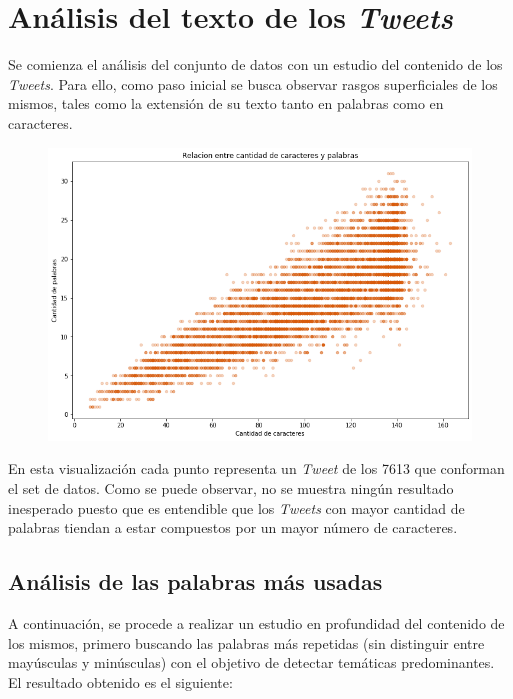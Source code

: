 \documentclass[titlepage,a4paper]{article}
\begin{document}
    \newpage
    \section{Análisis del texto de los \textit{Tweets}}\label{sec:intro}
    
    Se comienza el análisis del conjunto de datos con un estudio del contenido de los \textit{Tweets}. Para ello, como paso inicial se busca observar rasgos superficiales de los mismos, tales como la extensión de su texto tanto en palabras como en caracteres.
    
    \begin{figure}[H]
    \centering
    \includegraphics[width=1\textwidth]{graficos/Analisis Lexico Grafico/relacion_entre_cantidad_caracteres_palabras.png}
    \caption{}  
    \end{figure}
    
    En esta visualización cada punto representa un \textit{Tweet} de los 7613 que conforman el set de datos. Como se puede observar, no se muestra ningún resultado inesperado puesto que es entendible que los \textit{Tweets} con mayor cantidad de palabras tiendan a estar compuestos por un mayor número de caracteres.
    
     \subsection{Análisis de las palabras más usadas}
    
    A continuación, se procede a realizar un estudio en profundidad del contenido de los mismos, primero buscando las palabras más repetidas (sin distinguir entre mayúsculas y minúsculas) con el objetivo de detectar temáticas predominantes. El resultado obtenido es el siguiente:
    
\end{document}
